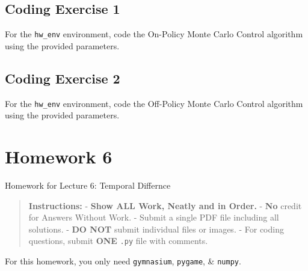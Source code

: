 \documentclass[
  letterpaper,
  DIV=11,
  numbers=noendperiod]{scrreprt}
\makeatletter
\newcommand*\pandocbounded[1]{%
  \sbox\pandoc@box{#1}%
  \Gscale@div\@tempa{\textheight}{\dimexpr\ht\pandoc@box+\dp\pandoc@box\relax}%
  \Gscale@div\@tempb{\linewidth}{\wd\pandoc@box}%
  \ifdim\@tempb\p@<\@tempa\p@\let\@tempa\@tempb\fi%
  \ifdim\@tempa\p@<\p@\scalebox{\@tempa}{\usebox\pandoc@box}%
  \else\usebox{\pandoc@box}%
  \fi%
}
\makeatother
\begin{document}
\section{Coding Exercise 1}\label{coding-exercise-1-2}

For the \texttt{hw\_env} environment, code the On-Policy Monte Carlo
Control algorithm using the provided parameters.

\section{Coding Exercise 2}\label{coding-exercise-2-1}

For the \texttt{hw\_env} environment, code the Off-Policy Monte Carlo
Control algorithm using the provided parameters.

\section{\texorpdfstring{\href{https://colab.research.google.com/drive/1Y_A4uKoSmjc6EmU-Or7tbeo3fe_ZD4RH?usp=sharing}{\protect\pandocbounded{}}}{}}\label{section-3}

\chapter{Homework 6}\label{homework-6}

\begin{tcolorbox}[enhanced jigsaw, colback=white, left=2mm, breakable, opacityback=0, bottomrule=.15mm, rightrule=.15mm, arc=.35mm, colframe=quarto-callout-note-color-frame, leftrule=.75mm, toprule=.15mm]

Homework for Lecture 6: Temporal Differnce 📝

\end{tcolorbox}

\begin{quote}
\textbf{Instructions:} - \textbf{Show ALL Work, Neatly and in Order.} -
\textbf{No} credit for Answers Without Work. - Submit a single PDF file
including all solutions. - \textbf{DO NOT} submit individual files or
images. - For coding questions, submit \textbf{ONE} \texttt{.py} file
with comments.
\end{quote}

\begin{tcolorbox}[enhanced jigsaw, opacityback=0, left=2mm, breakable, bottomtitle=1mm, rightrule=.15mm, colframe=quarto-callout-note-color-frame, titlerule=0mm, colback=white, opacitybacktitle=0.6, toptitle=1mm, title=\textcolor{quarto-callout-note-color}{\faInfo}\hspace{0.5em}{Note}, colbacktitle=quarto-callout-note-color!10!white, bottomrule=.15mm, arc=.35mm, coltitle=black, leftrule=.75mm, toprule=.15mm]

For this homework, you only need \texttt{gymnasium}, \texttt{pygame}, \&
\texttt{numpy}.

\end{tcolorbox}
\end{document}

